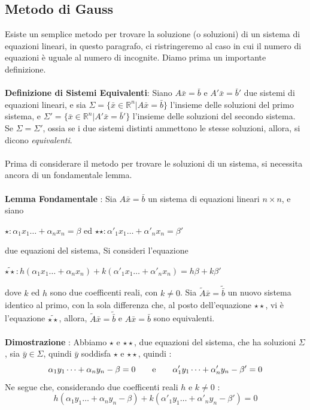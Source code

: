 \documentclass[12pt, letterpaper]{article}
\newcommand{\R}{{\mathbb R}}
\newcommand{\acc}{\\\hphantom{}\\}
\begin{document}
\subsection{Metodo di Gauss}\label{metGauss}
Esiste un semplice metodo per trovare la soluzione (o soluzioni) di un sistema di equazioni lineari, in questo 
paragrafo, ci ristringeremo al caso in cui il numero di equazioni è uguale al numero di incognite. Diamo prima un importante definizione.
\acc\textbf{Definizione di Sistemi Equivalenti}: Siano \(A\bar x = \bar b\) e \(A'\bar x = \bar b'\) due sistemi di equazioni 
lineari, e sia \(\Sigma = \{\bar x\in \R^n | A\bar x = \bar b\}\) l'insieme delle soluzioni del primo sistema, e
\(\Sigma' = \{\bar x\in \R^n | A'\bar x = \bar b'\}\) l'insieme delle soluzioni del secondo sistema. Se \(\Sigma=\Sigma'\), 
ossia se i due sistemi distinti ammettono le stesse soluzioni, allora, si dicono \textit{equivalenti}.\acc 
Prima di considerare il metodo per trovare le soluzioni di un sistema, si necessita ancora di un fondamentale lemma.\acc 
\textbf{Lemma Fondamentale} : Sia \(A\bar x = \bar b\) un sistema di equazioni lineari \(n\times n\), e siano\begin{center} 
\(\star : \alpha_1x_1\dots+\alpha_nx_n=\beta\) \hphantom{aa}ed\hphantom{aa} \(\star\star : \alpha'_1x_1\dots+\alpha'_nx_n=\beta'\)\end{center} due equazioni 
del sistema, Si consideri l'equazione\begin{center}  \(\tilde{\star\star} : h(\alpha_1x_1\dots+\alpha_nx_n)
+k(\alpha'_1x_1\dots+\alpha'_nx_n)=h\beta+k\beta'\)\end{center} dove \(k\) ed \(h\) sono due 
coefficenti reali, con \(k\ne 0\). Sia \(\tilde A\bar x = \tilde{\bar b}\) un nuovo sistema identico al primo, con la sola 
differenza che, al posto dell'equazione \(\star\star\), vi è l'equazione \(\tilde{\star\star}\), allora, 
\(\tilde A\bar x = \tilde{\bar b}\) e \(A\bar x = \bar b\) sono equivalenti. \acc
\textbf{Dimostrazione }: Abbiamo \(\star\) e \(\star\star\), due equazioni del sistema, che ha 
soluzioni \(\Sigma\), sia \(\bar y\in\Sigma\), quindi \(\bar y\) soddisfa \(\star\) e \(\star\star\), quindi : 
\begin{equation}
    \alpha_1y_1\dots+\alpha_ny_n-\beta = 0 \text{\hphantom{aaaa}e\hphantom{aaaa}} \alpha'_1y_1\dots+\alpha'_ny_n-\beta' = 0
\end{equation}
Ne segue che, considerando due coefficenti reali \(h\) e \(k\ne 0\) :\begin{equation}
    h(\alpha_1y_1\dots+\alpha_ny_n-\beta)+k(\alpha'_1y_1\dots+\alpha'_ny_n-\beta')=0
\end{equation}
\end{document}
